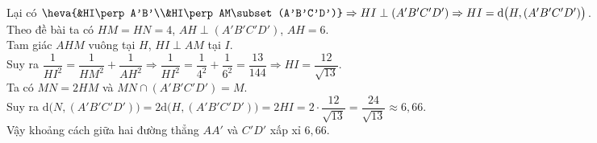 \begin{ex}
{		Lại có $\heva{&HI\perp A'B'\\&HI\perp AM\subset (A'B'C'D')}\Rightarrow HI\perp (A'B'C'D') \Rightarrow HI= \mathrm{d}\big(H,(A'B'C'D')\big)$.\\
		Theo đề bài ta có $HM=HN=4$, $AH\perp (A'B'C'D')$, $AH=6$.\\
		Tam giác $AHM$ vuông tại $H$, $HI\perp AM$ tại $I$.\\
		Suy ra $\dfrac{1}{HI^2}= \dfrac{1}{HM^2}+\dfrac{1}{AH^2}\Rightarrow \dfrac{1}{HI^2}= \dfrac{1}{4^2}+\dfrac{1}{6^2}=\dfrac{13}{144}\Rightarrow HI=\dfrac{12}{\sqrt{13}}$.\\
		Ta có $MN=2HM$ và $MN\cap (A'B'C'D')=M$.\\
		Suy ra $\mathrm{d}\big(N,(A'B'C'D')\big)=2\mathrm{d}\big(H,(A'B'C'D')\big)=2HI=2\cdot \dfrac{12}{\sqrt{13}}=\dfrac{24}{\sqrt{13}}\approx 6{,}66$.\\
		Vậy khoảng cách giữa hai đường thẳng $AA'$ và $C'D'$ xấp xỉ $6{,}66$.
	}
\end{ex}

